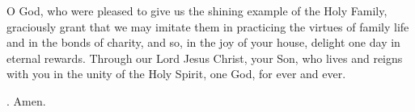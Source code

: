 \lettrine[lines=3]{O}{} God, who were pleased to give us
the shining example of the Holy Family,
graciously grant that we may imitate them
in practicing the virtues of family life and in the bonds of charity,
and so, in the joy of your house,
delight one day in eternal rewards.
Through our Lord Jesus Christ, your Son,
who lives and reigns with you in the unity of the Holy Spirit,
one God, for ever and ever. \par \Rbar. Amen.
